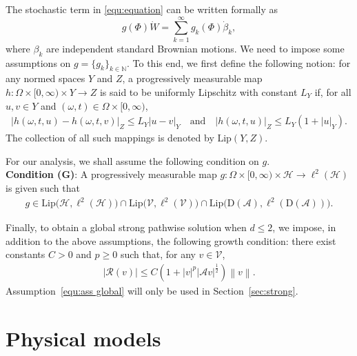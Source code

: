 \documentclass[11pt, reqno]{amsart}
\theoremstyle{definition}
\numberwithin{equation}{section}
\newcommand{\bb}{\mathbb}
\newcommand{\norm}[1]{\left\|{#1}\right\|}
\newcommand{\abs}[1]{\left|{#1}\right|}
\begin{document}
\vspace{1ex}
The stochastic term in \eqref{equ:equation} can be written formally as
\begin{equation}\label{equ:g form}
	g(\Phi) \dot{W}= \sum_{k=1}^\infty g_k(\Phi) \dot{\beta}_k,
\end{equation}
where $\beta_k$ are independent standard Brownian motions. We need to impose some assumptions on $g= \{g_k\}_{k\in \bb{N}}$. To this end, we first define the following notion: for any normed spaces $Y$ and $Z$, a progressively measurable map $h:\Omega\times [0,\infty)\times Y\to Z$ is said to be uniformly Lipschitz with constant $L_Y$ if, for all $u,v\in Y$ and $(\omega,t)\in \Omega\times[0,\infty)$,
\begin{align*}
	\abs{h(\omega,t,u)-h(\omega,t,v)}_{Z} \leq L_Y \abs{u-v}_Y
\quad\text{and}\quad
	\abs{h(\omega,t,u)}_{Z} \leq L_Y \left(1+\abs{u}_Y\right).
\end{align*}
The collection of all such mappings is denoted by $\text{Lip}(Y, Z)$.

For our analysis, we shall assume the following condition on $g$. 
\\[1ex]
\textbf{Condition (G)}:
A progressively measurable map $g:\Omega\times [0,\infty)\times \mathcal{H} \to \ell^2(\mathcal{H})$ is given such that
\begin{align}\label{equ:cond G}
	g\in \text{Lip}\big(\mathcal{H}, \ell^2(\mathcal{H})\big) \cap \text{Lip}\big(\mathcal{V}, \ell^2(\mathcal{V})\big) \cap \text{Lip}\big(\mathrm{D}(\mathcal{A}), \ell^2(\mathrm{D}(\mathcal{A}))\big).
\end{align}

Finally, to obtain a global strong pathwise solution when $d\leq 2$, we impose, in addition to the above assumptions, the following growth condition: there exist constants $C>0$ and $p\geq 0$ such that, for any $v\in\mathcal{V}$,
\begin{align}\label{equ:ass global}
	\abs{\mathcal{R}(v)} \leq C\left(1+ \abs{v}^p \abs{\mathcal{A} v}^{\frac12}\right) \norm{v}.
\end{align}
Assumption~\eqref{equ:ass global} will only be used in Section~\ref{sec:strong}.


\section{Physical models}\label{sec:examples}
\end{document}
